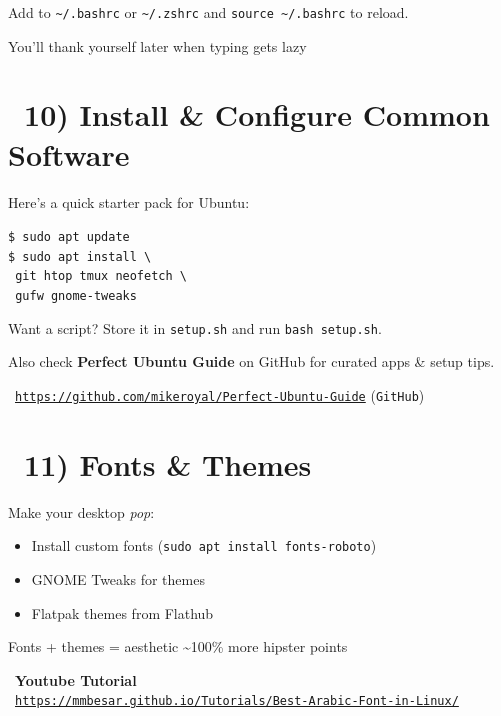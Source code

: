 \documentclass[12pt]{article}
\newcommand{\videoicon}{\faVideo}
\newcommand{\toolicon}{\faTools}
\newcommand{\themeicon}{\faPalette}
\begin{document}
Add to \texttt{\textasciitilde/.bashrc} or \texttt{\textasciitilde/.zshrc} and \texttt{source \textasciitilde/.bashrc} to reload.

You'll thank yourself later when typing gets lazy \faSmile

\section*{\toolicon\ 10) Install \& Configure Common Software}

Here's a quick starter pack for Ubuntu:

\begin{highlightbox}
\texttt{\$ sudo apt update}\\
\texttt{\$ sudo apt install \textbackslash}\\
\texttt{    git htop tmux neofetch \textbackslash}\\
\texttt{    gufw gnome-tweaks}
\end{highlightbox}

Want a script? Store it in \texttt{setup.sh} and run \texttt{bash setup.sh}.

Also check \textbf{Perfect Ubuntu Guide} on GitHub for curated apps \& setup tips.
\begin{infobox}
\faArrowRight\ \href{https://github.com/mikeroyal/Perfect-Ubuntu-Guide}{\texttt{https://github.com/mikeroyal/Perfect-Ubuntu-Guide}} (\texttt{GitHub})
\end{infobox}

\section*{\themeicon\ 11) Fonts \& Themes}

Make your desktop \textit{pop}:

\begin{itemize}
    \item Install custom fonts (\texttt{sudo apt install fonts-roboto})
    \item GNOME Tweaks for themes
    \item Flatpak themes from Flathub
\end{itemize}

Fonts + themes = aesthetic \textasciitilde100\% more hipster points \faSmile

\begin{infobox}
\videoicon\ \textbf{Youtube Tutorial}\\
\faArrowRight\ \href{https://mmbesar.github.io/Tutorials/Best-Arabic-Font-in-Linux/}{\texttt{https://mmbesar.github.io/Tutorials/Best-Arabic-Font-in-Linux/}}
\end{infobox}
\end{document}
